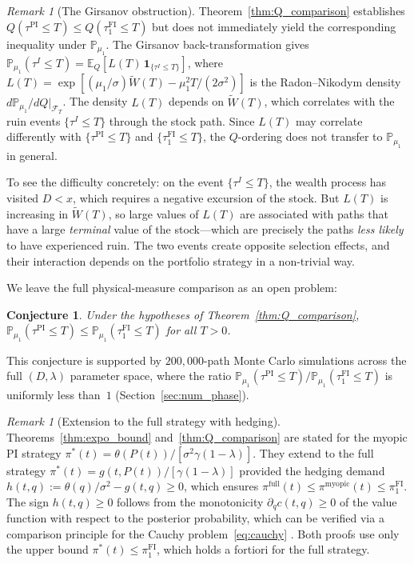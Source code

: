\documentclass[12pt]{article}
\newtheorem{conjecture}[theorem]{Conjecture}
\theoremstyle{remark}
\newtheorem{remark}[theorem]{Remark}
\theoremstyle{definition}
\newcommand{\E}{\mathbb{E}}
\newcommand{\Prob}{\mathbb{P}}
\newcommand{\FI}{\mathrm{FI}}
\newcommand{\PI}{\mathrm{PI}}
\begin{document}
\begin{remark}[The Girsanov obstruction]
\label{rem:girsanov}
Theorem~\ref{thm:Q_comparison} establishes
$Q(\tau^{\PI} \le T) \le Q(\tau_1^{\FI} \le T)$ but does not immediately
yield the corresponding inequality under $\Prob_{\mu_1}$.
The Girsanov back-transformation gives
$\Prob_{\mu_1}(\tau^I \le T)
  = \E_Q[L(T)\,\mathbf{1}_{\{\tau^I \le T\}}]$,
where $L(T) = \exp[(\mu_1/\sigma)\widetilde{W}(T)
  - \mu_1^2 T/(2\sigma^2)]$ is the Radon--Nikodym density
$d\Prob_{\mu_1}/dQ\big|_{\mathcal{F}_T}$.
The density $L(T)$ depends on $\widetilde{W}(T)$, which correlates
with the ruin events $\{\tau^I \le T\}$ through the stock path.
Since $L(T)$ may correlate differently with $\{\tau^{\PI} \le T\}$ and
$\{\tau_1^{\FI} \le T\}$, the $Q$-ordering does not transfer to
$\Prob_{\mu_1}$ in general.

To see the difficulty concretely: on the event $\{\tau^I \le T\}$, the
wealth process has visited $D < x$, which requires a negative excursion
of the stock.
But $L(T)$ is increasing in $\widetilde{W}(T)$, so large values of
$L(T)$ are associated with paths that have a large \emph{terminal}
value of the stock---which are precisely the paths \emph{less likely}
to have experienced ruin.
The two events create opposite selection effects, and their interaction
depends on the portfolio strategy in a non-trivial way.

We leave the full physical-measure comparison as an open problem:
\begin{conjecture}\label{conj:physical}
Under the hypotheses of Theorem~\ref{thm:Q_comparison},
$\Prob_{\mu_1}(\tau^{\PI} \le T) \le \Prob_{\mu_1}(\tau_1^{\FI} \le T)$
for all $T > 0$.
\end{conjecture}
This conjecture is supported by $200{,}000$-path Monte Carlo
simulations across the full $(D, \lambda)$ parameter space, where the
ratio $\Prob_{\mu_1}(\tau^{\PI} \le T)/\Prob_{\mu_1}(\tau_1^{\FI} \le T)$
is uniformly less than~$1$ (Section~\ref{sec:num_phase}).
\end{remark}

\begin{remark}[Extension to the full strategy with hedging]
\label{rem:hedging_ext}
Theorems~\ref{thm:expo_bound} and~\ref{thm:Q_comparison} are stated
for the myopic PI strategy
$\pi^*(t) = \theta(P(t))/[\sigma^2\gamma(1-\lambda)]$.
They extend to the full strategy
$\pi^*(t) = g(t,P(t))/[\gamma(1-\lambda)]$ provided the hedging demand
$h(t,q) := \theta(q)/\sigma^2 - g(t,q) \ge 0$, which ensures
$\pi^{\text{full}}(t) \le \pi^{\text{myopic}}(t) \le \pi_1^{\FI}$.
The sign $h(t,q) \ge 0$ follows from the monotonicity
$\partial_q c(t,q) \ge 0$ of the value function with respect to the
posterior probability, which can be verified via a comparison principle
for the Cauchy problem~\eqref{eq:cauchy}
\citep[cf.][Remark~3.7]{HuangSun2025}.
Both proofs use only the upper bound $\pi^*(t) \le \pi_1^{\FI}$, which
holds a fortiori for the full strategy.
\end{remark}
\end{document}
